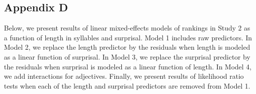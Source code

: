 \subsection{Appendix D}

Below, we present results of linear mixed-effects models of rankings in Study 2 as a function of length in syllables and surprisal.
Model 1 includes raw predictors.
In Model 2, we replace the length predictor by the residuals when length is modeled as a linear function of surprisal.
In Model 3, we replace the surprisal predictor by the residuals when surprisal is modeled as a linear function of length.
In Model 4, we add interactions for adjectives.
Finally, we present results of likelihood ratio tests when each of the length and surprisal predictors are removed from Model 1.

\vspace{4mm}

